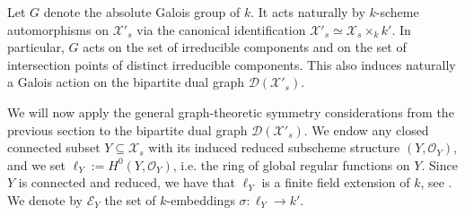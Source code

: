 \documentclass[a4paper,12pt,reqno]{amsart}
\newcommand\mc\mathcal
\theoremstyle{definition}
\numberwithin{equation}{thm}
\begin{document}
Let $G$ denote the absolute Galois group of $k$. It acts naturally by $k$-scheme automorphisms on $\mc{X}'_s$ via the canonical identification $\mc{X}'_s\simeq \mc{X}_s \times_k k'$. In particular, $G$  acts on the set of irreducible components and on the set of intersection points of distinct irreducible components. This also induces naturally a Galois action on the bipartite dual graph $\mc{D}(\mc{X}'_s)$.

\smallskip



We will now apply the general graph-theoretic symmetry considerations from the previous section to the bipartite dual graph $\mathcal{D}(\mc{X}'_s)$.
We endow any closed connected subset $Y \subseteq \mc{X}_s$ with its induced reduced subscheme structure $(Y,\mathcal{O}_Y)$, and we set $\ell_Y:=H^0(Y, \mc{O}_Y)$, i.e. the ring of global regular functions on $Y$. 
Since $Y$ is connected and reduced, we have that $\ell_Y$ is a finite field extension of $k$, see \cite[Corollary 3.3.21]{Liu}. We denote by $\mc{E}_Y$ the set of $k$-embeddings $\sigma: \ell_Y \to k'$.
\end{document}
